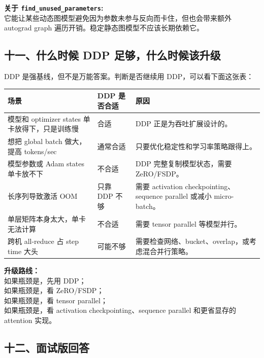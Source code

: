 \begin{intubox}
\textbf{关于 \texttt{find\_unused\_parameters}:}\\
它能让某些动态图模型避免因为参数未参与反向而卡住，但也会带来额外 autograd graph 遍历开销。稳定静态图模型不应该长期依赖它。
\end{intubox}

\subsection{十一、什么时候 DDP 足够，什么时候该升级}

DDP 是强基线，但不是万能答案。判断是否继续用 DDP，可以看下面这张表：

\begin{center}
{\small
\begin{tabular}{p{4cm}p{4.2cm}p{4.6cm}}
\hline
\textbf{场景} & \textbf{DDP 是否合适} & \textbf{原因} \\
\hline
模型和 optimizer states 单卡放得下，只是训练慢 & 合适 & DDP 正是为吞吐扩展设计的。 \\
想把 global batch 做大，提高 tokens/sec & 通常合适 & 只要优化稳定性和学习率策略跟得上。 \\
模型参数或 Adam states 单卡放不下 & 不合适 & DDP 完整复制模型状态，需要 ZeRO/FSDP。 \\
长序列导致激活 OOM & 只靠 DDP 不够 & 需要 activation checkpointing、sequence parallel 或减小 micro-batch。 \\
单层矩阵本身太大，单卡无法计算 & 不合适 & 需要 tensor parallel 等模型并行。 \\
跨机 all-reduce 占 step time 大头 & 可能不够 & 需要检查网络、bucket、overlap，或考虑混合并行策略。 \\
\hline
\end{tabular}
}
\end{center}

\begin{summarybox}
\textbf{升级路线：}\\
如果瓶颈是，先用 DDP；\\
如果瓶颈是，看 ZeRO/FSDP；\\
如果瓶颈是，看 tensor parallel；\\
如果瓶颈是，看 activation checkpointing、sequence parallel 和更省显存的 attention 实现。
\end{summarybox}

\subsection{十二、面试版回答}

